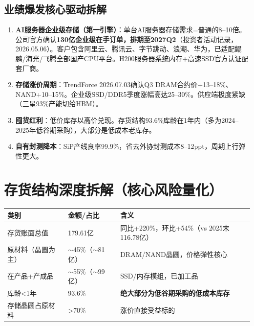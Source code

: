 \documentclass[a4paper,11pt,fontset=none]{ctexart}
\begin{document}
\subsection*{业绩爆发核心驱动拆解}

\begin{enumerate}
  \item \textbf{AI服务器企业级存储（第一引擎）}：单台AI服务器存储需求=普通的8--10倍。公司官方确认\textbf{130亿企业级在手订单，排期至2027Q2}（投资者活动记录，2026.05.06）。客户包含阿里云、腾讯云、字节跳动、浪潮、华为，已适配鲲鹏/海光/飞腾全部国产CPU平台。H200服务器系统内存+高速SSD官方认证配套厂商。
  \item \textbf{存储涨价周期}：TrendForce 2026.07.03确认Q3 DRAM合约价+13--18\%、NAND+10--15\%。企业级SSD/DDR5季度涨幅高达25--30\%。供应端极度紧缺（三星93\%产能切给HBM）。
  \item \textbf{囤货红利}：低价库存以高价兑现。存货结构93.6\%库龄在1年内（多为2024--2025年低谷期采购），大部分是低成本老库存。
  \item \textbf{自有封测降本}：SiP产线良率99.9\%，省去外协封测成本8--12ppt，周期上行弹性更大。
\end{enumerate}

\section{存货结构深度拆解（核心风险量化）}

\begin{exhibitbox}
\begin{tabularx}{\textwidth}{L{3.5cm}L{2cm}X}
\toprule
\textbf{类别} & \textbf{金额/占比} & \textbf{含义} \\
\midrule
存货账面总值 & 179.61亿 & 同比+220\%，环比+54\%（vs 2025末116.78亿） \\
原材料（晶圆为主） & $\sim$45\%（$\sim$81亿） & DRAM/NAND晶圆，价格弹性核心 \\
在产品+产成品 & $\sim$55\%（$\sim$99亿） & SSD/内存模组，已加工品 \\
库龄<1年 & 93.6\% & \textbf{绝大部分为低谷期采购的低成本库存} \\
存储晶圆占原材料 & >70\% & 涨价直接受益标的 \\
\bottomrule
\end{tabularx}
\end{exhibitbox}
\end{document}
